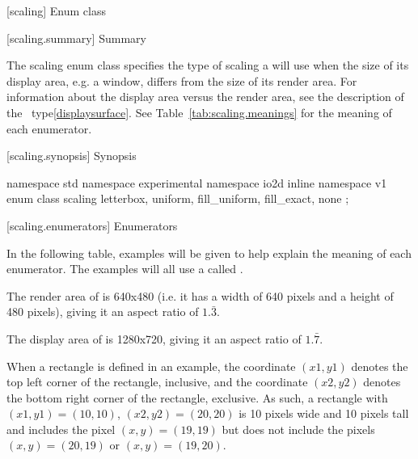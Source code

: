  [scaling] {Enum class }

 [scaling.summary] { Summary}

\pnum
The scaling enum class specifies the type of scaling a  
will use when the size of its display area, e.g. a window, differs from the 
size of its render area. For information about the display area versus the render area, see the description of the ~type\ref{displaysurface}. See 
Table~\ref{tab:scaling.meanings} for the meaning of each
 enumerator.

 [scaling.synopsis] { Synopsis}

\begin{codeblock}
namespace std { namespace experimental { namespace io2d { inline namespace v1 {
  enum class scaling {
    letterbox,
    uniform,
    fill_uniform,
    fill_exact,
    none
  };
} } } }
\end{codeblock}

 [scaling.enumerators] { Enumerators}

\pnum
\enternote
In the following table, examples will be given to help explain the meaning of each enumerator. The examples will all use a  called .

The render area of  is 640x480 (i.e. it has a width of 640 pixels and a height of 480 pixels), giving it an aspect ratio of $1.\bar{3}$.

The display area of  is 1280x720, giving it an aspect ratio of $1.\bar{7}$.

When a rectangle is defined in an example, the coordinate $(x1,y1)$ denotes the top left corner of the rectangle, inclusive, and the coordinate $(x2,y2)$ denotes the bottom right corner of the rectangle, exclusive. As such, a rectangle with $(x1,y1) = (10,10)$, $(x2,y2) = (20, 20)$ is 10 pixels wide and 10 pixels tall and includes the pixel $(x,y) = (19,19)$ but does not include the pixels $(x,y) = (20,19)$ or $(x,y) = (19,20)$.
\exitnote

